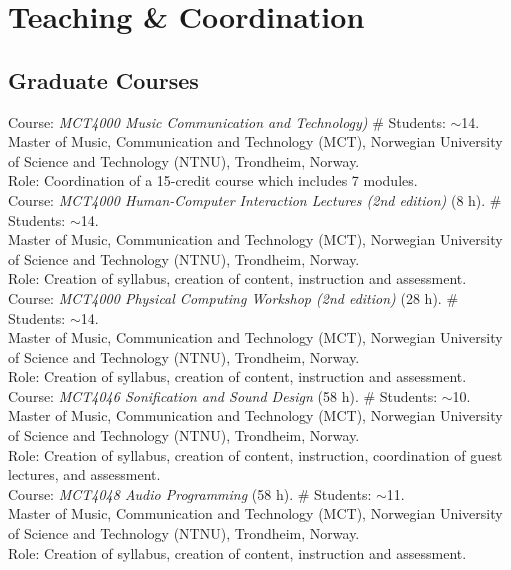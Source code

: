 \documentclass[10pt, a4paper]{article}
\newcommand{\years}[1]{\marginnote{\scriptsize #1}}
\begin{document}
\section*{Teaching \& Coordination}

\subsection*{Graduate Courses}
\noindent

\years{10/2019}Course: \emph{MCT4000 Music Communication and Technology)} \# Students: $\sim$14. \\
Master of Music, Communication and Technology (MCT), Norwegian University of Science and Technology (NTNU), Trondheim, Norway.\\ 
Role: Coordination of a 15-credit course which includes 7 modules.\\
\years{10/2019}Course: \emph{MCT4000 Human-Computer Interaction Lectures (2nd edition)} (8 h). \# Students: $\sim$14. \\
Master of Music, Communication and Technology (MCT), Norwegian University of Science and Technology (NTNU), Trondheim, Norway.\\ 
Role: Creation of syllabus, creation of content, instruction and assessment.\\
\years{10/2019}Course: \emph{MCT4000 Physical Computing Workshop (2nd edition)} (28 h). \# Students: $\sim$14. \\
Master of Music, Communication and Technology (MCT), Norwegian University of Science and Technology (NTNU), Trondheim, Norway.\\ 
Role: Creation of syllabus, creation of content, instruction and assessment.\\
\years{1/2019}Course: \emph{MCT4046 Sonification and Sound Design} (58 h). \# Students: $\sim$10. \\
Master of Music, Communication and Technology (MCT), Norwegian University of Science and Technology (NTNU), Trondheim, Norway.\\ 
Role: Creation of syllabus, creation of content, instruction, coordination of guest lectures, and assessment.\\
\years{1/2019}Course: \emph{MCT4048 Audio Programming} (58 h). \# Students: $\sim$11. \\
Master of Music, Communication and Technology (MCT), Norwegian University of Science and Technology (NTNU), Trondheim, Norway.\\ 
Role: Creation of syllabus, creation of content, instruction and assessment.\\
\end{document}
